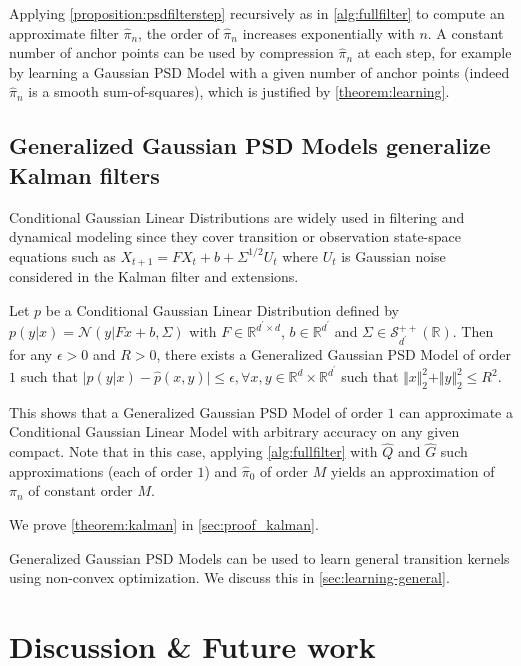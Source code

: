 Applying \cref{proposition:psdfilterstep} recursively as in \cref{alg:fullfilter} to compute an approximate filter $\hat \pi_n$, the order of $\hat\pi_n$ increases exponentially with $n$. A constant number of anchor points can be used by compression $\hat\pi_n$ at each step, for example by learning a Gaussian PSD Model with a given number of anchor points (indeed $\hat\pi_n$ is a smooth sum-of-squares), which is justified by \cref{theorem:learning}.

\subsection{Generalized Gaussian PSD Models generalize Kalman filters}

Conditional Gaussian Linear Distributions are widely used in filtering and dynamical modeling since they cover transition or observation state-space equations such as $X_{t+1} = FX_t + b + \Sigma^{1/2} U_t$ where $U_t$ is Gaussian noise considered in the Kalman filter and extensions.

\begin{theorem}\label{theorem:kalman}
Let $p$ be a Conditional Gaussian Linear Distribution defined by $p(y | x) = \mathcal N(y | Fx + b, \Sigma)$ with $F\in\mathbb R^{d ^\prime\times d}$, $b\in\mathbb R^{d^\prime}$ and $\Sigma\in\mathcal S^{++}_{d^\prime}(\mathbb R)$. Then for any $\epsilon>0$ and $R>0$, there exists a Generalized Gaussian PSD Model of order $1$ such that $\vert p(y | x) - \hat p(x, y) \vert \leq \epsilon, $$\forall x, y \in \mathbb R^d \times \mathbb R^{d^\prime}$ such that $\Vert x\Vert_2^2 + \Vert y \Vert_2^2 \leq R^2$.
\end{theorem}

This shows that a Generalized Gaussian PSD Model of order $1$ can approximate a Conditional Gaussian Linear Model with arbitrary accuracy on any given compact. Note that in this case, applying \cref{alg:fullfilter} with $\hat Q$ and $\hat G$ such approximations (each of order $1$) and $\hat\pi_0$ of order $M$ yields an approximation of $\pi_n$ of constant order $M$.

We prove \cref{theorem:kalman} in \cref{sec:proof_kalman}.

Generalized Gaussian PSD Models can be used to learn general transition kernels using non-convex optimization. We discuss this in \cref{sec:learning-general}.



\section{Discussion \& Future work}

